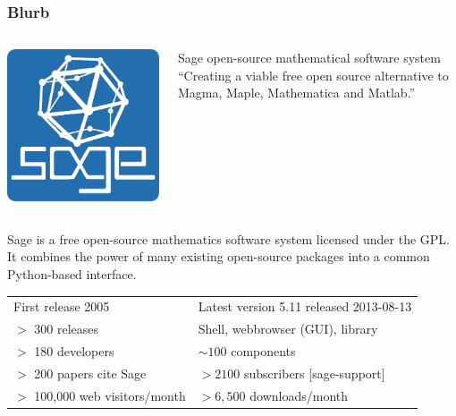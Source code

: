 \documentclass[9pt]{beamer}
\begin{document}
\begin{frame}
\frametitle{Blurb}

\begin{columns}


\begin{center}
 \includegraphics[height=0.9\textwidth]{./sage-logo.png}
\vspace{0.5em}
\end{center}

\begin{block}{Sage open-source mathematical software system}
``Creating a viable free open source alternative to Magma, Maple, Mathematica and Matlab.''
\end{block}
\end{columns}

\vspace{1em}

Sage is a free open-source mathematics software system licensed under the GPL. It combines the power of many existing open-source packages into a common Python-based interface.

\vspace{1em}

\begin{tabular}{ll}
First release 2005 & Latest version 5.11 released 2013-08-13\\
$>$ 300 releases  & Shell, webbrowser (GUI), library\\
$>$ 180 developers  & $\sim 100$ components\\
$>$ 200 papers cite Sage & $> 2100$ subscribers [sage-support]\\
$>$ 100,000 web visitors/month&  $> 6,500$ downloads/month\\
\end{tabular}
\end{frame}
\end{document}
